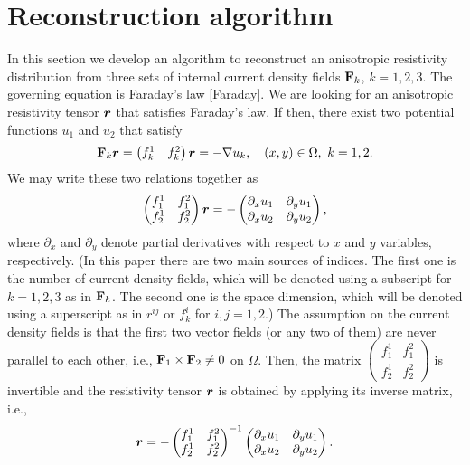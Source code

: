 \documentclass[11pt]{amsart}
\theoremstyle{plain}
\numberwithin{equation}{section}
\numberwithin{Thm}{section}
\def\F{{\bf F}}
\def\r{{\bf r}}
\def\r{\mbox{\boldmath$r$}}
\begin{document}
\section{Reconstruction algorithm}\label{sect.algo}
In this section we develop an algorithm to reconstruct an anisotropic resistivity distribution from three sets of internal current density fields $\F_k$, $k=1,2,3$. The governing equation is Faraday's law \eqref{Faraday}. We are looking for an anisotropic resistivity tensor $\r$ that satisfies Faraday's law. If then, there exist two potential functions $u_1$ and $u_2$ that satisfy
$$
\F_k\r =\begin{pmatrix} f^1_k & f^2_k \end{pmatrix}\r = -\nabla u_k, \quad (x,y)\in\Omega,\ k=1,2.
$$
We may write these two relations together as
$$
\begin{pmatrix} f^1_1 & f^2_1 \\ f^1_2 &f^2_2  \end{pmatrix}\r = -\begin{pmatrix} \partial_x u_1 & \partial_y u_1\\ \partial_x u_2 & \partial_y u_2\end{pmatrix},
$$
where $\partial_x$ and $\partial_y$ denote partial derivatives with respect to $x$ and $y$ variables, respectively. (In this paper there are two main sources of indices. The first one is the number of current density fields, which will be denoted using a subscript for $k=1,2,3$ as in $\F_k$. The second one is the space dimension, which will be denoted using a superscript as in $r^{ij}$ or $f^i_k$ for $i,j=1,2$.) The assumption on the current density fields is that the first two vector fields (or any two of them) are never parallel to each other, i.e., $\F_1 \times \F_2 \ne 0$ on $\Omega$. Then, the matrix $\begin{pmatrix} f^1_1 & f^2_1 \\ f^1_2 &f^2_2  \end{pmatrix}$ is invertible and the resistivity tensor $\r$ is obtained by applying its inverse matrix, i.e.,
\begin{equation}\label{R}
\r= -\begin{pmatrix} f^1_1 & f^2_1 \\ f^1_2 &f^2_2  \end{pmatrix}^{-1}
\begin{pmatrix} \partial_x u_1 & \partial_y u_1\\ \partial_x u_2 & \partial_y u_2\end{pmatrix}.\end{equation}
\end{document}
